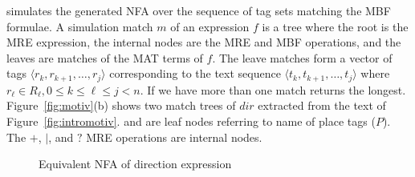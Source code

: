 \framework simulates the generated NFA over the sequence of tag sets matching the MBF formulae.
A simulation match $m$ of an expression $f$ is a tree where the root is the 
MRE expression, the internal nodes are the MRE and MBF operations, and the 
leaves are matches of the MAT terms of $f$.
The leave matches form a vector of tags
$\langle r_k,r_{k+1},\dots,r_j\rangle$ 
corresponding to the text sequence 
$\langle t_k,t_{k+1},\dots,t_j\rangle$ where $r_{\ell}\in R_{\ell},0\le k\le \ell \le j < n$.
%
%
If we have more than one match %
\framework returns the longest. 
%
Figure~\ref{fig:motiv}(b) shows two match trees of $\mathit{dir}$ extracted 
from the text of Figure~\ref{fig:intromotiv}.
 and  are leaf nodes referring to name of place tags ($P$). 
The $+$, $|$, and $?$ MRE operations
are internal nodes.


\setarab
\transfalse

\begin{figure}[tb!]
\centering
{}
  \caption{Equivalent NFA of direction expression}
  \label{fig:nfaEx}
\end{figure}
\transtrue
{}

